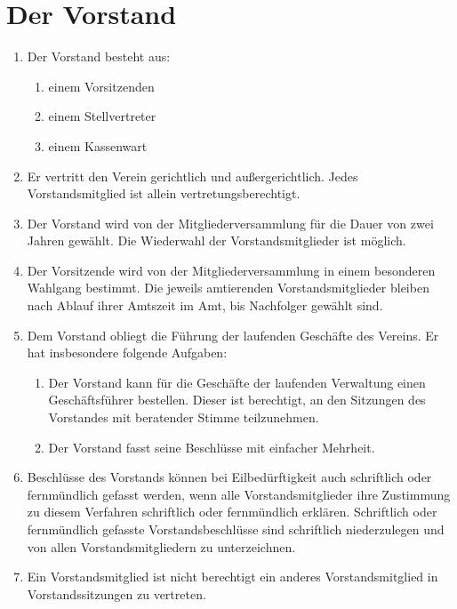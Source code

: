 \documentclass[a4paper,ngerman]{scrartcl}
\begin{document}
\section{Der Vorstand}
\begin{enumerate}
\item Der Vorstand besteht aus:
\begin{enumerate}
\item einem Vorsitzenden
\item einem Stellvertreter
\item einem Kassenwart
\end{enumerate}
\item Er vertritt den Verein gerichtlich und außergerichtlich. Jedes Vorstandsmitglied ist allein vertretungsberechtigt.
\item Der Vorstand wird von der Mitgliederversammlung für die Dauer von zwei Jahren gewählt. Die Wiederwahl der Vorstandsmitglieder ist möglich.
\item Der Vorsitzende wird von der Mitgliederversammlung in einem besonderen Wahlgang bestimmt. Die jeweils amtierenden Vorstandsmitglieder bleiben nach Ablauf ihrer Amtszeit im Amt, bis Nachfolger gewählt sind.
\item Dem Vorstand obliegt die Führung der laufenden Geschäfte des Vereins. Er hat insbesondere folgende Aufgaben:
\begin{enumerate}
\item Der Vorstand kann für die Geschäfte der laufenden Verwaltung einen Geschäftsführer bestellen. Dieser ist berechtigt, an den Sitzungen des Vorstandes mit beratender Stimme teilzunehmen.
\item Der Vorstand fasst seine Beschlüsse mit einfacher Mehrheit.
\end{enumerate}
\item Beschlüsse des Vorstands können bei Eilbedürftigkeit auch schriftlich oder fernmündlich gefasst werden, wenn alle Vorstandsmitglieder ihre Zustimmung zu diesem Verfahren schriftlich oder fernmündlich erklären. Schriftlich oder fernmündlich gefasste Vorstandsbeschlüsse sind schriftlich niederzulegen und von allen Vorstandsmitgliedern zu unterzeichnen.
\item Ein Vorstandsmitglied ist nicht berechtigt ein anderes Vorstandsmitglied in Vorstandssitzungen zu vertreten.
\end{enumerate}
\end{document}
